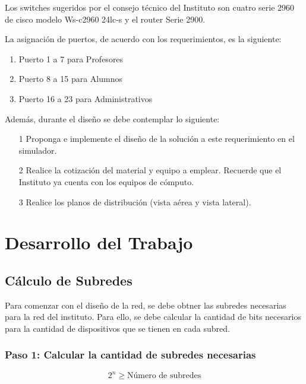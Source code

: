 Los switches sugeridos por el consejo técnico del Instituto son cuatro serie 2960 de cisco modelo Ws-c2960 24lc-s y el router Serie 2900.

La asignación de puertos, de acuerdo con los requerimientos, es la siguiente:

\begin{enumerate}
    \item Puerto 1 a 7 para Profesores
    \item Puerto 8 a 15 para Alumnos
    \item Puerto 16 a 23 para Administrativos
\end{enumerate}

Además, durante el diseño se debe contemplar lo siguiente:

\begin{enumerate}
    \item [1] Proponga e implemente el diseño de la solución a este requerimiento en el simulador.
    \item [2] Realice la cotización del material y equipo a emplear. Recuerde que el Instituto ya cuenta con los equipos de cómputo.
    \item [3] Realice los planos de distribución (vista aérea y vista lateral).
\end{enumerate}

\section{Desarrollo del Trabajo}

    \subsection{Cálculo de Subredes}

    Para comenzar con el diseño de la red, se debe obtner las subredes necesarias para la red del instituto. Para ello, se debe calcular la cantidad de bits necesarios para la cantidad de dispositivos que se tienen en cada subred.

    \subsubsection*{Paso 1: Calcular la cantidad de subredes necesarias}

    \begin{equation}
        2^{n} \geq \text{Número de subredes} 
        \label{eq:subredes}
    \end{equation}

